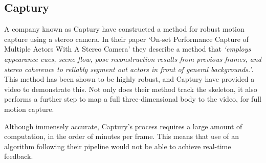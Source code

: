 \subsection{Captury}

A company known as Captury\cite{captury} have constructed a method for robust motion capture using a stereo camera. In their paper `On-set Performance Capture of Multiple Actors With A Stereo Camera'\cite{capturystereopaper} they describe a method that \emph{`employs appearance cues, scene flow, pose reconstruction results from previous frames, and stereo coherence to reliably segment out actors in front of general backgrounds.'}. This method has been shown to be highly robust, and Captury have provided a video\cite{capturyvideo} to demonstrate this. Not only does their method track the skeleton, it also performs a further step to map a full three-dimensional body to the video, for full motion capture.

Although immensely accurate, Captury's process requires a large amount of computation, in the order of minutes per frame. This means that use of an algorithm following their pipeline would not be able to achieve real-time feedback.